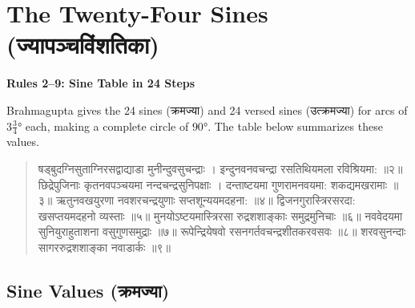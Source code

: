 \documentclass[11pt,a4paper]{book}
\newcommand{\dev}[1]{{\devanagarifont #1}}
\newenvironment{shloka}{%
  \begin{verse}
  \devanagarifont\color{versecolor}%
}{\end{verse}}
\newcommand{\ruleheading}[1]{%
  \par\vspace{0.8em}\noindent\textbf{\color{sectioncolor}#1}\par\vspace{0.3em}%
}
\begin{document}
\section{The Twenty-Four Sines (\dev{ज्यापञ्चविंशतिका})}

\ruleheading{Rules 2--9: Sine Table in 24 Steps}

\noindent
Brahmagupta gives the 24 sines (\dev{क्रमज्या}) and 24 versed sines (\dev{उत्क्रमज्या}) for arcs of $3\frac{3}{4}°$ each, making a complete circle of $90°$. The table below summarizes these values.

\begin{shloka}
\begin{altverse}
\dev{षड्बुदग्निसुताग्निरसद्वाद्याडा मुनीन्दुवसुचन्द्राः ।}
\dev{इन्दुनवनवचन्द्रा रसतिथियमला रविश्रियमा: ॥२॥}
\dev{छिद्रेपुजिनाः कृतनवपञ्चयमा नन्दचन्द्रसुनिपक्षाः ।}
\dev{दन्ताष्टयमा गुणरामनवयमा: शकद्यमखरामाः ॥३॥}
\dev{ऋतुनवखयुरणा नवशरचन्द्रयुणाः सप्तशून्ययमदहना: ॥४॥}
\dev{द्विजनगुरास्त्रिरसरदा: खसप्तयमदहनो व्यस्ताः ॥५॥}
\dev{मुनयोऽष्टयमास्त्रिरसा रुद्रशशाङ्काः समुद्रमुनिचाः ॥६॥}
\dev{नववेदयमा सुनियुराहुताशना वसुगुणसमुद्राः ॥७॥}
\dev{रूपेन्द्रियेषवो रसनगर्तवचन्द्रशीतकरवसवः ॥८॥}
\dev{शरवसुनन्दाः सागररुद्रशशाङ्का नवाडार्कः ॥९॥}
\end{altverse}
\end{shloka}

\subsection{Sine Values (\dev{क्रमज्या})}
\end{document}
